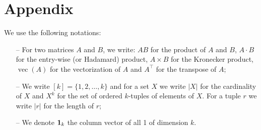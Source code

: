 \documentclass{article}
\theoremstyle{plain}
\DeclareMathOperator{\vect}{vec}
\begin{document}
\section{Appendix}
We use the following notations:
\vspace{-.3333\baselineskip}
\begin{itemize}[leftmargin= *]
\item[--] For two matrices $A$ and $B$, we write: $AB$ for the product of $A$ and $B$, $A\cdot B$ for the entry-wise (or Hadamard) product, $A\times B$ for the Kronecker product, $\vect (A)$ for the vectorization of $A$ and $A^\top$ for the transpose of $A$;
\vspace{-.5\baselineskip}
\item[--]  We write $[k] = \{1,2,\dots,k\}$ and for a set $X$ we write $|X|$ for the cardinality of $X$ and $X^k$ for the set of ordered $k$-tuples of elements of $X$. For a tuple $r$ we write $|r|$ for the length of $r$;
\vspace{-.5\baselineskip}
\item[--]  We denote ${\bf 1}_k$ the column vector of all 1 of dimension $k$.
\end{itemize}
\end{document}
